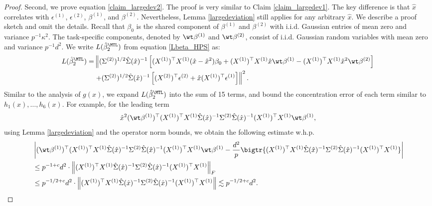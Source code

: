 \documentclass[aos,preprint]{imsart}
\begin{document}
\begin{proof}
Second, we prove equation \eqref{claim_largedev2}.
The proof is very similar to Claim \ref{claim_largedev1}.
The key difference is that $\hat x$ correlates with $\epsilon^{(1)}$, $\epsilon^{(2)}$, $\beta^{(1)}$, and $\beta^{(2)}$.
Nevertheless, Lemma \ref{largedeviation} still applies for any arbitrary $\hat x$.
We describe a proof sketch and omit the details.
Recall that $\beta_0$ is the shared component of $\beta^{(1)}$ and $\beta^{(2)}$ with i.i.d. Gaussian entries of mean zero and variance $p^{-1}\kappa^2$.
The task-specific components, denoted by $\wt\beta^{(1)}$ and $\wt\beta^{(2)}$, consist of i.i.d. Gaussian random variables with mean zero and variance $p^{-1} d^2$.
We write $L(\hat{\beta}_2^{\MTL}) $ from equation \eqref{Lbeta_HPS} as:
\begin{align}
L(\hat{\beta}_2^{\MTL})  =&  \left\| (\Sigma^{(2)})^{1/2}\hat \Sigma(\hat x)^{-1} \left[(X^{(1)})^\top X^{(1)} (\hat x -\hat x^2)\beta_0+(X^{(1)})^\top X^{(1)} \hat x\wt \beta^{(1)} - (X^{(1)})^\top X^{(1)}  \hat x^2\wt \beta^{(2)} \right] \right. \nonumber\\
&\left. + (\Sigma^{(2)})^{1/2}\hat \Sigma(\hat x)^{-1}\left[ (X^{(2)})^\top \epsilon^{(2)} + \hat x   (X^{(1)})^\top \epsilon^{(1)} \right]\right\|^2. \label{expand_15}
\end{align}
Similar to the analysis of $g(x)$, we expand $L(\hat{\beta}_2^{\MTL})$ into the sum of 15 terms, and bound the concentration error of each term similar to $h_1(x), \dots, h_6(x)$.
For example, for the leading term 
\[\hat x^2 (\wt \beta^{(1)})^\top (X^{(1)})^\top X^{(1)} \hat \Sigma(\hat x)^{-1}  \Sigma^{(2)} \hat \Sigma(\hat x)^{-1}  (X^{(1)})^\top X^{(1)}\wt\beta^{(1)},\] 
using Lemma \ref{largedeviation} and the operator norm bounds, we obtain the following estimate w.h.p.
\begin{align*}
&  \left| (\wt \beta^{(1)})^\top (X^{(1)})^\top X^{(1)} \hat \Sigma(\hat x)^{-1}  \Sigma^{(2)} \hat \Sigma(\hat x)^{-1}  (X^{(1)})^\top X^{(1)}\wt\beta^{(1)} - \frac{d^2}{p}\bigtr{(X^{(1)})^\top X^{(1)} \hat \Sigma(\hat x)^{-1}  \Sigma^{(2)} \hat \Sigma(\hat x)^{-1}  (X^{(1)})^\top X^{(1)}}\right| \\
&\le p^{-1+c}d^2 \cdot \left\| (X^{(1)})^\top X^{(1)} \hat \Sigma(\hat x)^{-1}  \Sigma^{(2)} \hat \Sigma(\hat x)^{-1}  (X^{(1)})^\top X^{(1)} \right\|_F \\
&\le p^{-1/2+c}d^2 \cdot  \left\| (X^{(1)})^\top X^{(1)} \hat \Sigma(\hat x)^{-1}  \Sigma^{(2)} \hat \Sigma(\hat x)^{-1}  (X^{(1)})^\top X^{(1)} \right\|  \lesssim p^{-1/2+c}d^2.
\end{align*} 

\end{proof}
\end{document}
